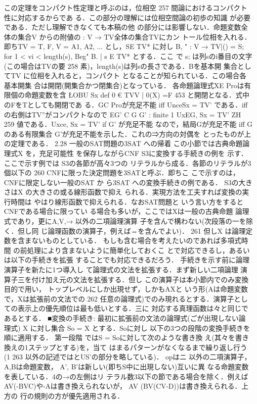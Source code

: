 \documentclass{ltjsarticle}
\theoremstyle{mystyle1}
\theoremstyle{mystyle3}
\theoremstyle{mystyle2}
\begin{document}
この定理をコンパクト性定理と呼ぶのは，位相空
257
間論におけるコンパクト性に対応するからであ る．この部分の理解には位相空間論の初歩の知識 が必要である．ただし理解できなくても本稿の他 の部分には影響しない．命題変数全体の集合V からの附値の : V → TV全体の集合TVにカン トール位相を入れる．即ちTV = {T, F}, V = {A1, A2, ... } とし，SE TV* に対し B, " { : V → TV|() = S; for 1 < vi < length(s)}, Beg" {B. | s E TV*} とする．ここ
で s; は列sのi番目の文字(この場合はTVの要
258
素)，length(s)は列sの長さである．Bを基本開 集合としてTV に位相を入れると，コンパクト となることが知られている．この場合各基本開集 合は開閉(開集合かつ閉集合)となっている． 各命題論理式XE Proは有限個の命題変数を含 ŁOBU Sx def {0 € TVV | 0(X) =F} 453 と開閉となる．式中のFをTとしても開閉であ る．GC Proが充足不能 iff UnceSx = TV' である．iffの右側はTV”がコンパクトなので EG' C G G' : finite 1 UxEG, Sx = TV' ZH
259
値である．Uxce, Sx = TV' if G' が充足不能 なので，結局Gが充足不能 iff Gのある有限集合 G'が充足不能を示した．これの⇒方向の対偶を とったものが上の定理である．
2.28 一般のSAT問題の3SAT への帰着
この小節では古典命題論理式X を，充足可能性 を保存しながらCNF S3に変換する手続きの例を 示す．ここで示す例では S3の各節が高々3つの リテラルから成る．各節のリテラルが3個以下の
260
CNFに限った決定問題を3SATと呼ぶ．即ちこ こで示すのは，CNFに限定しない一般のSAT か ら3SAT への変換手続きの例である． S3の大きさはX の大きさの或る線形函数で抑え られる．実現方法を工夫すれば変換の実行時間は やはり線形函数で抑えられる．なおSAT問題と いう言い方をするとCNFである場合に限ってい る場合も多いが，ここではXは一般の古典命題 論理式であり，更にA,V,→ 以外の二項論理演算 子を含んで構わない(次段落の一を除く．但し同 じ論理函数の演算子，例えば⇔を含んでよい)．
261
但しX は論理定数を含まないものとしている． もしも含む場合を考えたいのであれば多項式時間 の前処理により含まないように簡単化しておくこ とで対応できるし，あるいは以下の手続きを拡張 することでも対応できるだろう． 手続きを示す前に論理演算子を新たに1つ導入し て論理式の文法を拡張する．まず新しい二項論理 演算子三を付け加え元の文法を拡張する．但し この演算子は本小節内でのみ変換目的で用い， トップレベルにしか出現せず，しかもAXと いう形(Aは命題変数で，Xは拡張前の文法での
262
任意の論理式)でのみ現れるとする．演算子とし ての表示上の優先順位は最も低いとする．三に 対応する真理函数は々と同じであるとする．
■変換の手続き: 最初に拡張前の文法の論理式(ごが出現しない論 理式) X に対し集合 So = {X} とする．Soに対し 以下の3つの段階の変換手続きを順に適用する． 第一段階 ではS = Soに対して次のような書き換 え(其々を書き換えの1ステップとする)を，当て はまるパターンがなくなるまで繰り返し行う (1
263
以外の記述では{と}US'の部分を略している)． opはニ 以外の二項演算子，A,Bは命題変数， A', B'は新しい(即ちS中に出現しない)互いに異 なる命題変数を表している．4の→の左側はリ テラル数3以下の節である場合を除く．例えば AV(-BVC)や-Aは書き換えられないが， AV (BV(CV-D))は書き換えられる．上方の 行の規則の方が優先適用される．
\end{document}
